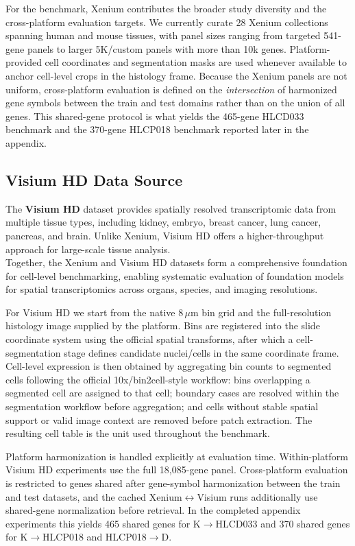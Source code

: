 \documentclass{article}
\begin{document}
For the benchmark, Xenium contributes the broader study diversity and the cross-platform evaluation targets. We currently curate 28 Xenium collections spanning human and mouse tissues, with panel sizes ranging from targeted 541-gene panels to larger 5K/custom panels with more than 10k genes. Platform-provided cell coordinates and segmentation masks are used whenever available to anchor cell-level crops in the histology frame. Because the Xenium panels are not uniform, cross-platform evaluation is defined on the \emph{intersection} of harmonized gene symbols between the train and test domains rather than on the union of all genes. This shared-gene protocol is what yields the 465-gene HLCD033 benchmark and the 370-gene HLCP018 benchmark reported later in the appendix.

\subsection{Visium HD Data Source}
\label{sec:st}
\noindent
The \textbf{Visium HD} dataset provides spatially resolved transcriptomic data from multiple tissue types,
including kidney, embryo, breast cancer, lung cancer, pancreas, and brain.
Unlike Xenium, Visium HD offers a higher-throughput approach for large-scale tissue analysis.
\\

\noindent
Together, the Xenium and Visium HD datasets form a comprehensive foundation for cell-level benchmarking, enabling systematic evaluation of foundation models for spatial transcriptomics across organs, species, and imaging resolutions.

For Visium HD we start from the native 8\,$\mu$m bin grid and the full-resolution histology image supplied by the platform. Bins are registered into the slide coordinate system using the official spatial transforms, after which a cell-segmentation stage defines candidate nuclei/cells in the same coordinate frame. Cell-level expression is then obtained by aggregating bin counts to segmented cells following the official 10x/bin2cell-style workflow: bins overlapping a segmented cell are assigned to that cell; boundary cases are resolved within the segmentation workflow before aggregation; and cells without stable spatial support or valid image context are removed before patch extraction. The resulting cell table is the unit used throughout the benchmark.

Platform harmonization is handled explicitly at evaluation time. Within-platform Visium HD experiments use the full 18,085-gene panel. Cross-platform evaluation is restricted to genes shared after gene-symbol harmonization between the train and test datasets, and the cached Xenium$\leftrightarrow$Visium runs additionally use shared-gene normalization before retrieval. In the completed appendix experiments this yields 465 shared genes for K$\!\rightarrow\!$HLCD033 and 370 shared genes for K$\!\rightarrow\!$HLCP018 and HLCP018$\!\rightarrow\!$D.
\end{document}
